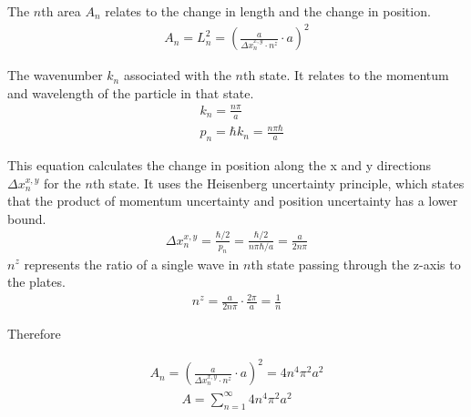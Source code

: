     The $n$th area $A_n$ relates to the change in length and the change in position.
    \begin{align}
        A_n = L_n^2 = (\frac{a}{\Delta x_n^{x,y} \cdot n^z} \cdot a)^2
    \end{align}

    The wavenumber $k_n$ associated with the $n$th state. It relates to the momentum and wavelength of the particle in that state.
    \begin{align}
        &k_n = \frac{n \pi}{a} \\
        &p_n = \hbar k_n = \frac{n \pi \hbar}{a}
    \end{align}

    This equation calculates the change in position along the x and y directions $\Delta x_n^{x,y}$ for the $n$th state. 
It uses the Heisenberg uncertainty principle, which states that the product of momentum uncertainty and position uncertainty 
has a lower bound.
    \begin{align}
        \Delta x_n^{x, y} = \frac{\hbar/2}{p_n} = \frac{\hbar/2}{n \pi \hbar/a} = \frac{a}{2 n \pi}
    \end{align}
$n^z$ represents the ratio of a single wave in $n$th state passing through the z-axis to the plates.
    \begin{align}
        n^z = \frac{a}{2 n \pi} \cdot \frac{2 \pi}{a} =\frac{1}{n}
    \end{align}
    
Therefore

    \begin{align}
        A_n = (\frac{a}{\Delta x_n^{x,y} \cdot n^z} \cdot a)^2 = 4 n^4 \pi^2 a^2
    \end{align}
    \begin{align}
        A = \sum_{n=1}^{\infty}4 n^4 \pi^2 a^2
    \end{align}


